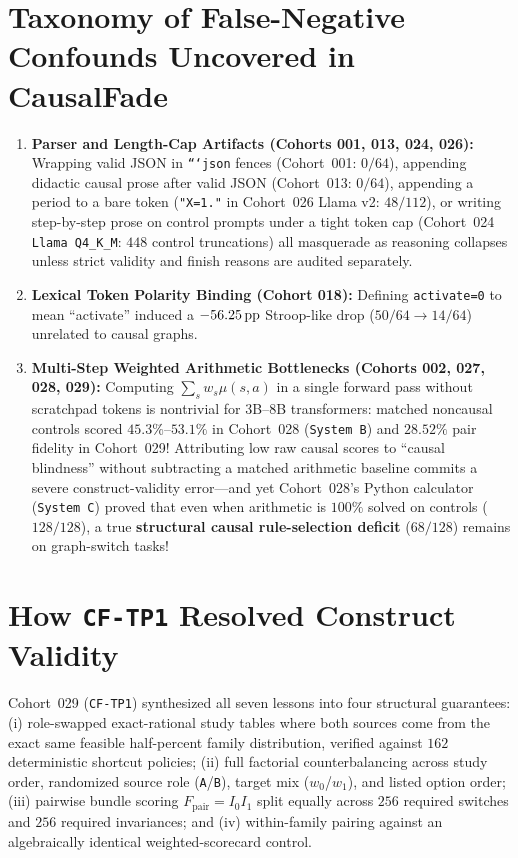 \section{Taxonomy of False-Negative Confounds Uncovered in CausalFade}

\begin{enumerate}
  \item \textbf{Parser and Length-Cap Artifacts (Cohorts 001, 013, 024, 026):} Wrapping valid JSON in \texttt{```json} fences (Cohort~001: $0/64$), appending didactic causal prose after valid JSON (Cohort~013: $0/64$), appending a period to a bare token (\texttt{"X=1."} in Cohort~026 Llama v2: $48/112$), or writing step-by-step prose on control prompts under a tight token cap (Cohort~024 \texttt{Llama Q4\_K\_M}: $448$ control truncations) all masquerade as reasoning collapses unless strict validity and finish reasons are audited separately.
  \item \textbf{Lexical Token Polarity Binding (Cohort 018):} Defining \texttt{activate=0} to mean ``activate'' induced a $-56.25\,\mathrm{pp}$ Stroop-like drop ($50/64 \to 14/64$) unrelated to causal graphs.
  \item \textbf{Multi-Step Weighted Arithmetic Bottlenecks (Cohorts 002, 027, 028, 029):} Computing $\sum_s w_s \mu(s,a)$ in a single forward pass without scratchpad tokens is nontrivial for 3B--8B transformers: matched noncausal controls scored $45.3\%$--$53.1\%$ in Cohort~028 (\texttt{System B}) and $28.52\%$ pair fidelity in Cohort~029! Attributing low raw causal scores to ``causal blindness'' without subtracting a matched arithmetic baseline commits a severe construct-validity error---and yet Cohort~028's Python calculator (\texttt{System C}) proved that even when arithmetic is $100\%$ solved on controls ($128/128$), a true \textbf{structural causal rule-selection deficit} ($68/128$) remains on graph-switch tasks!
\end{enumerate}

\section{How \texttt{CF-TP1} Resolved Construct Validity}
Cohort~029 (\texttt{CF-TP1}) synthesized all seven lessons into four structural guarantees: (i) role-swapped exact-rational study tables where both sources come from the exact same feasible half-percent family distribution, verified against $162$ deterministic shortcut policies; (ii) full factorial counterbalancing across study order, randomized source role (\texttt{A}/\texttt{B}), target mix ($w_0$/$w_1$), and listed option order; (iii) pairwise bundle scoring $F_{\mathrm{pair}} = I_0 I_1$ split equally across $256$ required switches and $256$ required invariances; and (iv) within-family pairing against an algebraically identical weighted-scorecard control.


